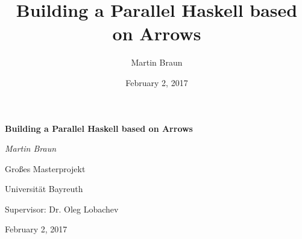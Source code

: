 \documentclass{beamer}
\title{Building a Parallel Haskell based on Arrows}
\author{Martin Braun}
\date{February 2, 2017}
\begin{document}
	\begin{frame}[fragile]
		\centering
		\vspace{2cm}
		{\huge\bfseries Building a Parallel Haskell based on Arrows\par}
		\vspace{0.5cm}
		{\Large\itshape Martin Braun\par}
		\vspace{0.5cm}
		\vfill
		Großes Masterprojekt\par
		Universität Bayreuth\par
		Supervisor:	Dr. Oleg Lobachev
		
		\vfill
		
		{\large February 2, 2017\par}
	\end{frame}
	\begin{frame}
		\tableofcontents
	\end{frame}
	
	
	
	
	
	
	
	
	
	\setcounter{tocdepth}{-1}
	
	\setcounter{tocdepth}{2}
\end{document}
